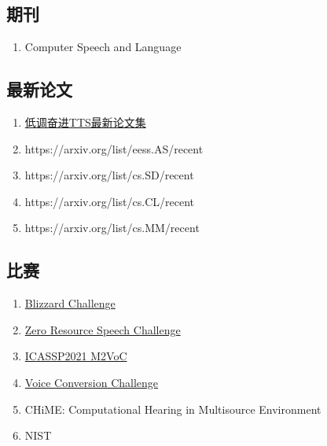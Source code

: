 \documentclass[cn,10pt,math=newtx,citestyle=gb7714-2015,bibstyle=gb7714-2015]{elegantbook}
\begin{document}
\subsection{期刊}
\begin{enumerate}
  \item Computer Speech and Language
\end{enumerate}

\subsection{最新论文}
\begin{enumerate}
  \item \href{http://yqli.tech/page/tts_paper.html}{低调奋进TTS最新论文集}
  \item https://arxiv.org/list/eess.AS/recent
  \item https://arxiv.org/list/cs.SD/recent
  \item https://arxiv.org/list/cs.CL/recent
  \item https://arxiv.org/list/cs.MM/recent
\end{enumerate}

\subsection{比赛}
\begin{enumerate}
  \item \href{http://www.festvox.org/blizzard/}{Blizzard Challenge}
  \item \href{https://www.zerospeech.com/}{Zero Resource Speech Challenge}
  \item \href{http://challenge.ai.iqiyi.com/detail?raceId=5fb2688224954e0b48431fe0}{ICASSP2021 M2VoC}
  \item \href{http://www.vc-challenge.org/}{Voice Conversion Challenge}
  \item CHiME: Computational Hearing in Multisource Environment
  \item NIST
\end{enumerate}
\end{document}

